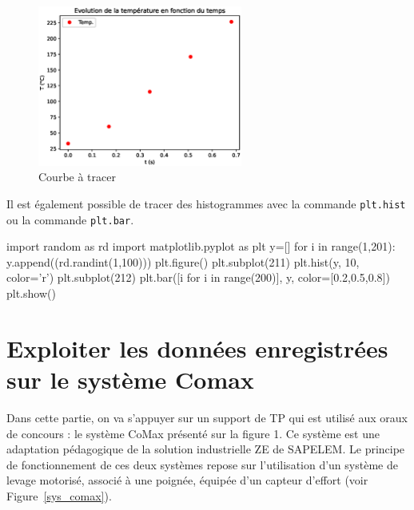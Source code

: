 \documentclass[a4paper,11pt,titlepage]{report}
\begin{document}
\vspace{5mm}

\begin{figure}[!h]
\centering
\includegraphics[width=0.6\textwidth]{image/Figure_1.eps}
\caption{Courbe à tracer}
\label{Figure_1}
\end{figure}

\vspace{5mm}
Il est également possible de tracer des histogrammes avec la commande \texttt{plt.hist} ou la commande \texttt{plt.bar}.

\vspace{5mm}
\begin{codePython}
import random as rd
import matplotlib.pyplot as plt
y=[]
for i in range(1,201):
    y.append((rd.randint(1,100)))
plt.figure()
plt.subplot(211)
plt.hist(y, 10, color='r')
plt.subplot(212)
plt.bar([i for i in range(200)], y, color=[0.2,0.5,0.8])
plt.show()
\end{codePython}

\newpage

\section{Exploiter les données enregistrées sur le système Comax}
Dans cette partie, on va s’appuyer sur un support de TP qui est utilisé aux oraux de concours : le système CoMax présenté sur la figure 1. Ce système est une adaptation pédagogique de la solution industrielle ZE de SAPELEM. Le principe de fonctionnement de ces deux systèmes repose sur l’utilisation d’un système de levage motorisé, associé à une poignée, équipée d'un capteur d’effort (voir Figure~\ref{sys_comax}).
\end{document}
